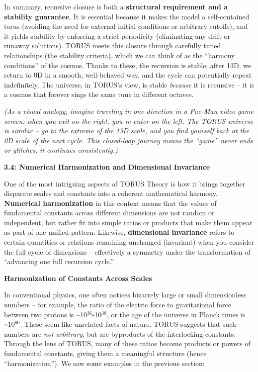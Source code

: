 \documentclass[]{article}
\newcommand{\superscript}[1]{\ensuremath{^{\mathrm{#1}}}}
\begin{document}
In summary, recursive closure is both a \textbf{structural requirement
and a stability guarantee}. It is essential because it makes the model a
self-contained torus (avoiding the need for external initial conditions
or arbitrary cutoffs), and it yields stability by enforcing a strict
periodicity (eliminating any drift or runaway solutions). TORUS meets
this closure through carefully tuned relationships (the stability
criteria), which we can think of as the ``harmony conditions'' of the
cosmos. Thanks to these, the recursion is stable: after 13D, we return
to 0D in a smooth, well-behaved way, and the cycle can potentially
repeat indefinitely. The universe, in TORUS's view, is stable
\emph{because} it is recursive -- it is a cosmos that forever sings the
same tune in different octaves.

\emph{(As a visual analogy, imagine traveling in one direction in a
Pac-Man video game screen: when you exit on the right, you re-enter on
the left. The TORUS universe is similar -- go to the extreme of the 13D
scale, and you find yourself back at the 0D scale of the next cycle.
This closed-loop journey means the ``game'' never ends or glitches; it
continues consistently.)}​

\textbf{3.4: Numerical Harmonization and Dimensional Invariance}

One of the most intriguing aspects of TORUS Theory is how it brings
together disparate scales and constants into a coherent mathematical
harmony. \textbf{Numerical harmonization} in this context means that the
values of fundamental constants across different dimensions are not
random or independent, but rather fit into simple ratios or products
that make them appear as part of one unified pattern. Likewise,
\textbf{dimensional invariance} refers to certain quantities or
relations remaining unchanged (invariant) when you consider the full
cycle of dimensions -- effectively a symmetry under the transformation
of ``advancing one full recursion cycle.''

\textbf{Harmonization of Constants Across Scales}

In conventional physics, one often notices bizarrely large or small
dimensionless numbers -- for example, the ratio of the electric force to
gravitational force between two protons is
\textasciitilde{}10\superscript{36}-10\superscript{38}, or the age of the universe in Planck
times is \textasciitilde{}10\superscript{60}. These seem like unrelated facts of
nature. TORUS suggests that such numbers are \emph{not arbitrary}, but
are byproducts of the interlocking constants. Through the lens of TORUS,
many of these ratios become products or powers of fundamental constants,
giving them a meaningful structure (hence ``harmonization''). We saw
some examples in the previous section:
\end{document}

